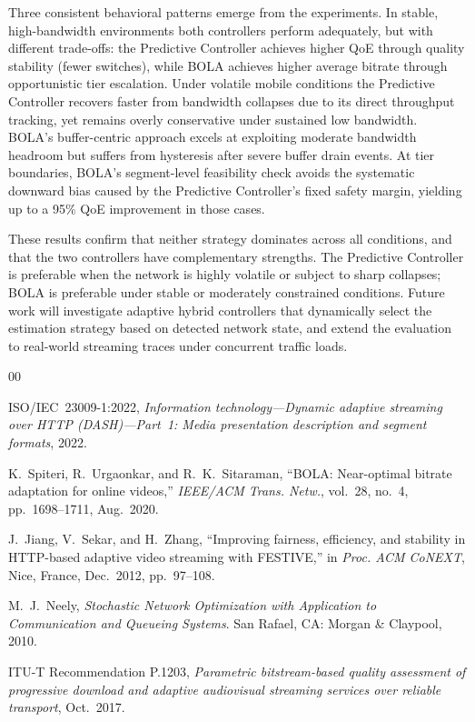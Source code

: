 \documentclass[conference]{IEEEtran}
\begin{document}
Three consistent behavioral patterns emerge from the experiments.  In
stable, high-bandwidth environments both controllers perform adequately,
but with different trade-offs: the Predictive Controller achieves higher
QoE through quality stability (fewer switches), while BOLA achieves
higher average bitrate through opportunistic tier escalation.  Under
volatile mobile conditions the Predictive Controller recovers faster
from bandwidth collapses due to its direct throughput tracking, yet
remains overly conservative under sustained low bandwidth.  BOLA's
buffer-centric approach excels at exploiting moderate bandwidth headroom
but suffers from hysteresis after severe buffer drain events.  At tier
boundaries, BOLA's segment-level feasibility check avoids the systematic
downward bias caused by the Predictive Controller's fixed safety margin,
yielding up to a 95\% QoE improvement in those cases.

These results confirm that neither strategy dominates across all
conditions, and that the two controllers have complementary strengths.
The Predictive Controller is preferable when the network is highly
volatile or subject to sharp collapses; BOLA is preferable under
stable or moderately constrained conditions.  Future work will investigate
adaptive hybrid controllers that dynamically select the estimation
strategy based on detected network state, and extend the evaluation to
real-world streaming traces under concurrent traffic loads.


\begin{thebibliography}{00}

ISO/IEC~23009-1:2022, \emph{Information technology---Dynamic adaptive
streaming over HTTP (DASH)---Part~1: Media presentation description and
segment formats}, 2022.

K.~Spiteri, R.~Urgaonkar, and R.~K.~Sitaraman, ``BOLA: Near-optimal bitrate
adaptation for online videos,'' \emph{IEEE/ACM Trans. Netw.}, vol.~28, no.~4,
pp.~1698--1711, Aug.~2020.

J.~Jiang, V.~Sekar, and H.~Zhang, ``Improving fairness, efficiency, and
stability in HTTP-based adaptive video streaming with FESTIVE,'' in
\emph{Proc. ACM CoNEXT}, Nice, France, Dec.~2012, pp.~97--108.

M.~J.~Neely, \emph{Stochastic Network Optimization with Application to
Communication and Queueing Systems}.  San Rafael, CA: Morgan \& Claypool,
2010.

ITU-T Recommendation P.1203, \emph{Parametric bitstream-based quality
assessment of progressive download and adaptive audiovisual streaming
services over reliable transport}, Oct.~2017.

\end{thebibliography}
\end{document}
